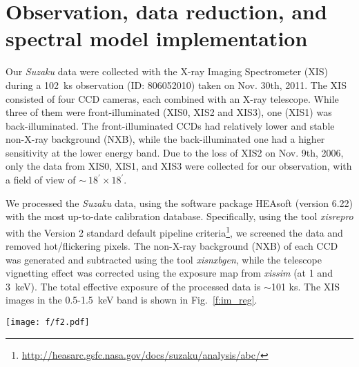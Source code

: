\documentclass[usenatbib]{mnras}
\def\xs{30 Doradus}
\begin{document}
\section{Observation, data reduction, and spectral model implementation}
\label{s:obs}

Our \textit{Suzaku} data were collected with the  X-ray Imaging Spectrometer (XIS) during a 102~ks observation (ID: 806052010) taken on Nov. 30th, 2011. The XIS consisted of four CCD cameras, each combined with an X-ray telescope. While three of them were front-illuminated (XIS0, XIS2 and XIS3), one (XIS1) was back-illuminated. The front-illuminated CCDs had relatively lower and stable non-X-ray background (NXB), while the back-illuminated one had a higher sensitivity at the lower energy band. Due to the loss of XIS2 on Nov. 9th, 2006, only the data from XIS0, XIS1, and XIS3 were collected for our observation, with a field of view of $\sim~18^{'}\times18^{'}$. 

We processed the \textit{Suzaku} data, using the software package HEAsoft (version 6.22) with the most up-to-date calibration database. Specifically, using the tool \textit{xisrepro} with the Version 2 standard default pipeline criteria\footnote{\url{http://heasarc.gsfc.nasa.gov/docs/suzaku/analysis/abc/}}, we screened the data and removed hot/flickering pixels. The non-X-ray background (NXB) of each CCD was generated and subtracted using the tool \textit{xisnxbgen}, while the telescope vignetting effect was corrected using the exposure map from \textit{xissim} (at 1 and 3~keV). The total effective exposure of the processed data is $\sim$101 ks. The XIS images in the 0.5-1.5~keV band is  shown in Fig.~\ref{f:im_reg}.  
 
\begin{figure*}
\texttt{[image: f/f2.pdf]}
\caption{\textit{Suzaku} intensity images of \xs\ in the $0.5-1.5$~keV band. The instrument background has been subtracted and the regions adopted for spectral extraction are outlined: (A) five individual on-nebula regions (outlined in red) and three off-nebula fields selected for background modeling (black dashed lines); (B) the entire nebula region, with or without the exclusion of Region 1 (the dashed circle) in the left panel.}
\label{f:im_reg}
\end{figure*}
\end{document}
